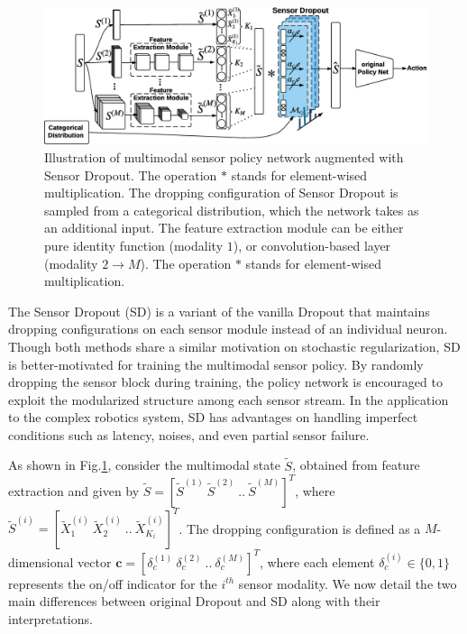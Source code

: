 \documentclass[../thesis.tex]{subfiles}
\begin{document}
\begin{figure}[t]
        \begin{center}
\centerline{\includegraphics[width=0.8\columnwidth]{./MultimodalDRL/fig/SD_new}} %
        \caption{Illustration of multimodal sensor policy network augmented with Sensor Dropout. The operation $*$ stands for element-wised multiplication. The dropping configuration of Sensor Dropout is sampled from a categorical distribution, which the network takes as an additional input. The feature extraction module can be either pure identity function (modality $1$), or convolution-based layer (modality $2 \to M$). The operation $*$ stands for element-wised multiplication.}
        \label{fig:Multi-SD}
        \end{center}
\end{figure}
 
 
The Sensor Dropout (SD) is a variant of the vanilla Dropout \cite{dropout} that maintains dropping configurations on each sensor module instead of an individual neuron. Though both methods share a similar motivation on stochastic regularization, SD is better-motivated for training the multimodal sensor policy. By randomly dropping the sensor block during training, the policy network is encouraged to exploit the modularized structure among each sensor stream. In the application to the complex robotics system, SD has advantages on handling imperfect conditions such as latency, noises, and even partial sensor failure.
 
 
As shown in Fig.\ref{fig:Multi-SD}, consider the multimodal state $\tilde{S}$, obtained from feature extraction and given by $\tilde{S}=[\tilde{S}^{(1)}~\tilde{S}^{(2)}~..~\tilde{S}^{(M)}]^T$, where $\tilde{S}^{(i)}= [\tilde{X}_1^{(i)}~\tilde{X}_2^{(i)}~..~\tilde{X}_{K_i}^{(i)}]^T$.
The dropping configuration is defined as a $M$-dimensional vector $\mathbf{c} = [\delta_{c}^{(1)}~\delta_{c}^{(2)}~..~\delta_{c}^{(M)}]^T$, where each element $\delta_{c}^{(i)} \in \{0,1\}$ represents the on/off indicator for the $i^{th}$ sensor modality. We now detail the two main differences between original Dropout and SD along with their interpretations.
 
\end{document}

